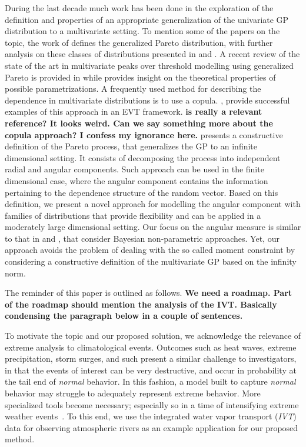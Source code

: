 During the last decade much work has been done in the exploration of the definition and properties of an
  appropriate generalization of the univariate GP distribution 
  to a multivariate setting.  To mention some of the papers on the topic, the work of
  \cite{rootzen2006} defines the generalized Pareto distribution, with further analysis on these classes
  of distributions presented in \cite{falk2008} and \cite{michel2008}.  A recent review of the state
  of the art in multivariate peaks over threshold modelling using generalized Pareto is provided in
  \cite{rootzen2018} while \cite{RoSeWa2018a} provides insight on the theoretical properties of possible parametrizations. 
  A frequently used method for describing the dependence
  in multivariate distributions is to use a copula. \cite{renard2007,deng2011,falk2019}, provide successful examples of this approach in an EVT framework. {\bf is \cite{deng2011} really a relevant reference? It looks weird. Can we say something more about the copula approach? I confess my ignorance here.}
  \cite{ferreira2014} presents a constructive definition of the Pareto process, that generalizes the GP to an infinite dimensional setting. It consists of decomposing the process into independent radial and angular components. Such approach can be used in the finite dimensional case, where the angular component 
  contains the information pertaining to the dependence structure of the random vector.
  Based on this definition, we present a novel approach for modelling  the angular component
  with families of distributions that provide flexibility and can be applied in a moderately large dimensional setting.
  Our focus on the  angular measure is similar to that in \cite{SaNa2014} and \cite{HaCaCh2017}, that consider Bayesian non-parametric approaches. Yet, our approach avoids the problem of dealing with the so called moment constraint by considering a constructive definition of the multivariate GP based on the infinity norm.
  
  The reminder of this paper is outlined as follows. {\bf We need a roadmap. Part of the roadmap should mention the analysis of the IVT. Basically condensing the paragraph below in a couple of sentences.}

To motivate the topic and our proposed solution, we acknowledge the relevance of extreme analysis to
  climatological events.  Outcomes such as heat waves, extreme precipitation, storm surges, and
  such present a similar challenge to investigators, in that the events of interest can be very destructive,
  and occur in probability at the tail end of \emph{normal} behavior.  In this fashion, a model built
  to capture \emph{normal} behavior may struggle to adequately represent extreme behavior.  More
  specialized tools become necessary; especially so in a time of intensifying extreme weather
  events~\citep{jentsch2007,vousdoukas2018,li2019}.  To this end, we use the integrated water vapor
  transport (\emph{IVT}) data for observing atmospheric rivers as an example application for our proposed method.
  
